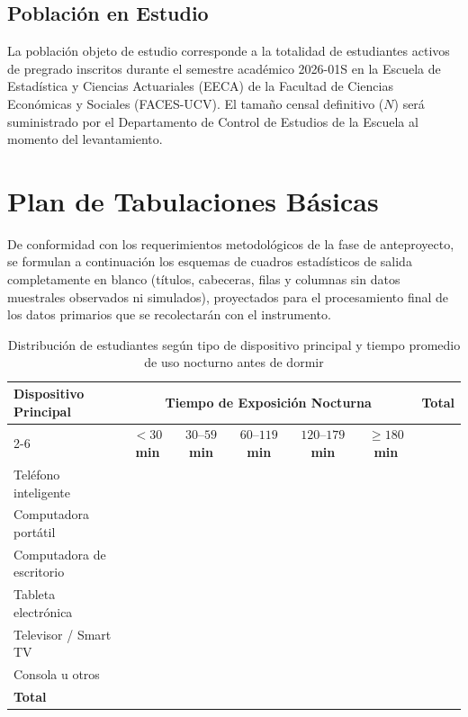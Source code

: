 \documentclass[12pt, letterpaper]{article}
\begin{document}
\subsection{Población en Estudio}
La población objeto de estudio corresponde a la totalidad de estudiantes activos de pregrado inscritos durante el semestre académico 2026-01S en la Escuela de Estadística y Ciencias Actuariales (EECA) de la Facultad de Ciencias Económicas y Sociales (FACES-UCV). El tamaño censal definitivo ($N$) será suministrado por el Departamento de Control de Estudios de la Escuela al momento del levantamiento.


\section{Plan de Tabulaciones Básicas}

De conformidad con los requerimientos metodológicos de la fase de anteproyecto, se formulan a continuación los esquemas de cuadros estadísticos de salida completamente en blanco (títulos, cabeceras, filas y columnas sin datos muestrales observados ni simulados), proyectados para el procesamiento final de los datos primarios que se recolectarán con el instrumento.

\begin{table}[H]
\centering
\caption{Distribución de estudiantes según tipo de dispositivo principal y tiempo promedio de uso nocturno antes de dormir}
\label{tab:tabulacion1}
\vspace{0.25cm}
\footnotesize
\begin{tabular}{lcccccc}
\toprule
\textbf{Dispositivo Principal} & \multicolumn{5}{c}{\textbf{Tiempo de Exposición Nocturna}} & \textbf{Total} \\
\cmidrule(lr){2-6}
& \textbf{$< 30$ min} & \textbf{$30\text{--}59$ min} & \textbf{$60\text{--}119$ min} & \textbf{$120\text{--}179$ min} & \textbf{$\ge 180$ min} & \\
\midrule
Teléfono inteligente & & & & & & \\
Computadora portátil & & & & & & \\
Computadora de escritorio & & & & & & \\
Tableta electrónica & & & & & & \\
Televisor / Smart TV & & & & & & \\
Consola u otros & & & & & & \\
\midrule
\textbf{Total} & & & & & & \\
\bottomrule
\end{tabular}
\end{table}
\end{document}
